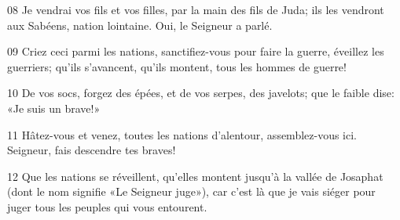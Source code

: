 
08 Je vendrai vos fils et vos filles, par la main des fils de Juda; ils les vendront aux Sabéens, nation lointaine. Oui, le Seigneur a parlé.

09 Criez ceci parmi les nations, sanctifiez-vous pour faire la guerre, éveillez les guerriers; qu’ils s’avancent, qu’ils montent, tous les hommes de guerre!

10 De vos socs, forgez des épées, et de vos serpes, des javelots; que le faible dise: «Je suis un brave!»

11 Hâtez-vous et venez, toutes les nations d’alentour, assemblez-vous ici. Seigneur, fais descendre tes braves!

12 Que les nations se réveillent, qu’elles montent jusqu’à la vallée de Josaphat (dont le nom signifie «Le Seigneur juge»), car c’est là que je vais siéger pour juger tous les peuples qui vous entourent.